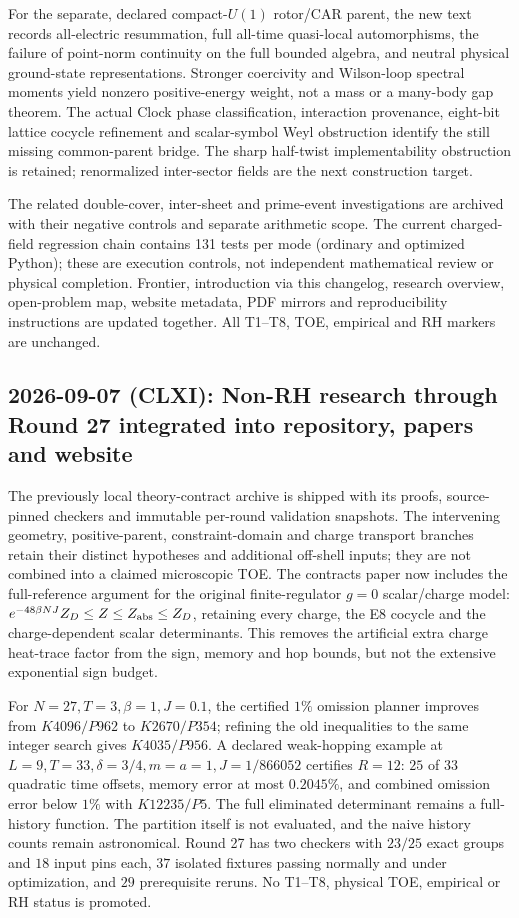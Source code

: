 \documentclass[11pt]{article}
\begin{document}
For the separate, declared compact-$U(1)$ rotor/CAR parent, the new text
records all-electric resummation, full all-time quasi-local automorphisms,
the failure of point-norm continuity on the full bounded algebra, and
neutral physical ground-state representations. Stronger coercivity and
Wilson-loop spectral moments yield nonzero positive-energy weight, not
a mass or a many-body gap theorem. The actual Clock phase classification,
interaction provenance, eight-bit lattice cocycle refinement and
scalar-symbol Weyl obstruction identify the still missing common-parent
bridge. The sharp half-twist implementability obstruction is retained;
renormalized inter-sector fields are the next construction target.

The related double-cover, inter-sheet and prime-event investigations are
archived with their negative controls and separate arithmetic scope.
The current charged-field regression chain contains 131 tests per mode
(ordinary and optimized Python); these are execution controls, not
independent mathematical review or physical completion. Frontier,
introduction via this changelog, research overview, open-problem map,
website metadata, PDF mirrors and reproducibility instructions are
updated together. All T1--T8, TOE, empirical and RH markers are unchanged.

\subsection*{2026-09-07 (CLXI): Non-RH research through Round 27 integrated into repository, papers and website}
The previously local theory-contract archive is shipped with its proofs,
source-pinned checkers and immutable per-round validation snapshots.
The intervening geometry, positive-parent, constraint-domain and charge
transport branches retain their distinct hypotheses and additional
off-shell inputs; they are not combined into a claimed microscopic TOE.
The contracts paper now includes the full-reference argument for the
original finite-regulator $g=0$ scalar/charge model:
$e^{-48\beta NJ}Z_D\le Z\le Z_{\rm abs}\le Z_D$, retaining every charge,
the E8 cocycle and the charge-dependent scalar determinants. This removes
the artificial extra charge heat-trace factor from the sign, memory and
hop bounds, but not the extensive exponential sign budget.

For $N=27,T=3,\beta=1,J=0.1$, the certified $1\%$ omission planner improves
from $K4096/P962$ to $K2670/P354$; refining the old inequalities to the same
integer search gives $K4035/P956$. A declared weak-hopping example at
$L=9,T=33,\delta=3/4,m=a=1,J=1/866052$ certifies $R=12$: $25$ of $33$
quadratic time offsets, memory error at most $0.2045\%$, and combined
omission error below $1\%$ with $K12235/P5$. The full eliminated determinant
remains a full-history function. The partition itself is not evaluated,
and the naive history counts remain astronomical. Round 27 has two checkers
with $23/25$ exact groups and $18$ input pins each, $37$ isolated fixtures
passing normally and under optimization, and $29$ prerequisite reruns.
No T1--T8, physical TOE, empirical or RH status is promoted.
\end{document}
